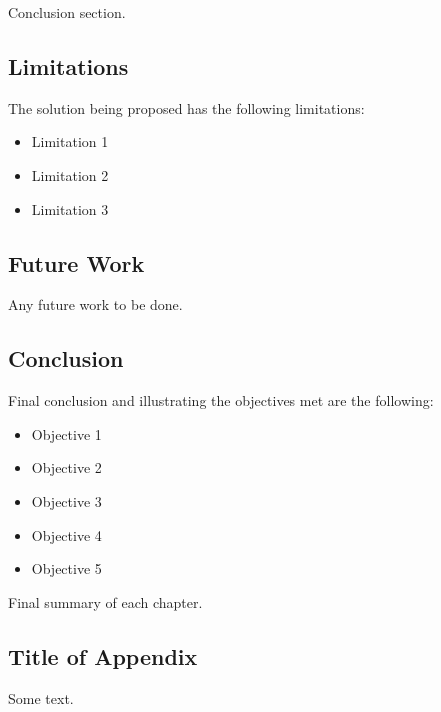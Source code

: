 \documentclass{mscreport}
\begin{document}
Conclusion section.

\subsection{Limitations}

The solution being proposed has the following limitations:
\begin{itemize}
 \item Limitation 1
 \item Limitation 2
 \item Limitation 3
\end{itemize}

\subsection{Future Work}

Any future work to be done.

\subsection{Conclusion}

Final conclusion and illustrating the objectives met are the following: 
\begin{itemize}
	\item Objective 1
	\item Objective 2
	\item Objective 3
	\item Objective 4
	\item Objective 5
\end{itemize}

Final summary of each chapter.

\newpage




\newpage

\begin{appendices}
\section{Title of Appendix}

Some text.

\end{appendices}
\end{document}
